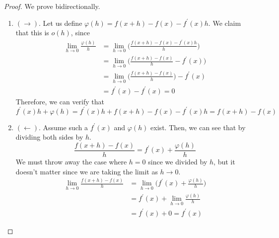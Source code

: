   \begin{proof}
    We prove bidirectionally. 
    \begin{enumerate}
      \item $(\rightarrow)$. Let us define $\varphi(h) = f(x + h) - f(x) - f^\prime (x) h$. We claim that this is $o(h)$, since 
        \begin{align}
          \lim_{h \to 0} \frac{\varphi(h)}{h} & = \lim_{h \to 0} \bigg( \frac{f(x + h) - f(x) - f^\prime (x) h }{h}\bigg) \\  
                                              & = \lim_{h \to 0} \bigg( \frac{f(x + h) - f(x)}{h} - f^\prime (x) \bigg) \\  
                                              & = \lim_{h \to 0} \bigg( \frac{f(x + h) - f(x)}{h} \bigg) - f^\prime (x)  \\  
                                              & = f^\prime(x) - f^\prime(x) = 0 
        \end{align}
        Therefore, we can verify that 
        \begin{equation}
          f^\prime (x) h + \varphi(h) = f^\prime (x) h + f(x + h) - f(x) - f^\prime (x) h = f(x + h) - f(x)
        \end{equation}

      \item $(\leftarrow)$. Assume such a $f^\prime (x)$ and $\varphi(h)$ exist. Then, we can see that by dividing both sides by $h$. 
        \begin{equation}
          \frac{f(x + h) - f(x)}{h} = f^\prime(x) + \frac{\varphi(h)}{h} 
        \end{equation}
        We must throw away the case where $h = 0$ since we divided by $h$, but it doesn't matter since we are taking the limit as $h \to 0$. 
        \begin{align}
          \lim_{h \to 0} \frac{f(x + h) - f(x)}{h} & = \lim_{h \to 0} \bigg( f^\prime (x) + \frac{\varphi(h)}{h} \bigg) \\ 
                                                   & = f^\prime (x) + \lim_{h \to 0} \frac{\varphi(h)}{h} \\ 
                                                   & = f^\prime(x) + 0 = f^\prime(x)
        \end{align}
    \end{enumerate}
  \end{proof} 

